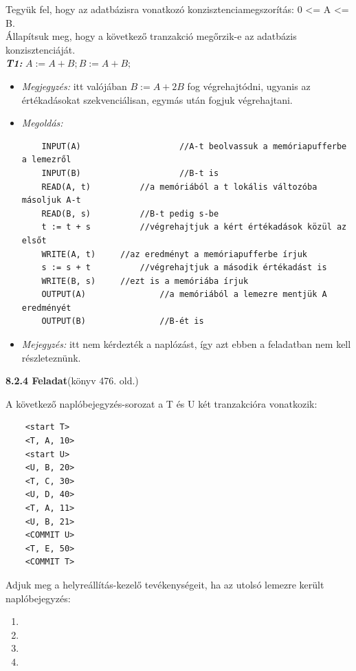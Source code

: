 \documentclass[a4paper,11.5pt, table]{article}
\begin{document}
	Tegyük fel, hogy az adatbázisra vonatkozó konzisztenciamegszorítás: 0 <= A <= B. \\
	Állapítsuk meg, hogy a következő tranzakció megőrzik-e az adatbázis konzisztenciáját.\\
	\textbf{\textit{T1:}} $ A := A + B; B := A + B;$
	\begin{itemize}
		\item \textit{Megjegyzés:} itt valójában $B := A + 2B$ fog végrehajtódni, ugyanis az értékadásokat szekvenciálisan, egymás után fogjuk végrehajtani. 
		
		\item \textit{Megoldás:}\\
		\begin{lstlisting}
	INPUT(A)					//A-t beolvassuk a memóriapufferbe a lemezről
	INPUT(B)					//B-t is
	READ(A, t)			//a memóriából a t lokális változóba másoljuk A-t
	READ(B, s)			//B-t pedig s-be
	t := t + s			//végrehajtjuk a kért értékadások közül az elsőt
	WRITE(A, t)		//az eredményt a memóriapufferbe írjuk 
	s := s + t			//végrehajtjuk a második értékadást is
	WRITE(B, s)		//ezt is a memóriába írjuk
	OUTPUT(A)				//a memóriából a lemezre mentjük A eredményét 
	OUTPUT(B)				//B-ét is
		\end{lstlisting}
		
		\item \textit{Mejegyzés:} itt nem kérdezték a naplózást, így azt ebben a feladatban nem kell részleteznünk.
	\end{itemize}

	{\large \textbf{8.2.4 Feladat}}(könyv 476. old.)
	
	A következő naplóbejegyzés-sorozat a T és U két tranzakcióra vonatkozik:
	\begin{lstlisting}
	<start T> 
	<T, A, 10> 
	<start U> 
	<U, B, 20> 
	<T, C, 30> 
	<U, D, 40>
	<T, A, 11>
	<U, B, 21>  
	<COMMIT U>
	<T, E, 50> 
	<COMMIT T>
	\end{lstlisting}
	Adjuk meg a helyreállítás-kezelő tevékenységeit, ha az utolsó lemezre került naplóbejegyzés:
	\begin{enumerate}[label=\alph*)]
		\item <start U> 
		\item <COMMIT U>
		\item <T, E, 50>
		\item <COMMIT T>
	\end{enumerate}
	
\end{document}
